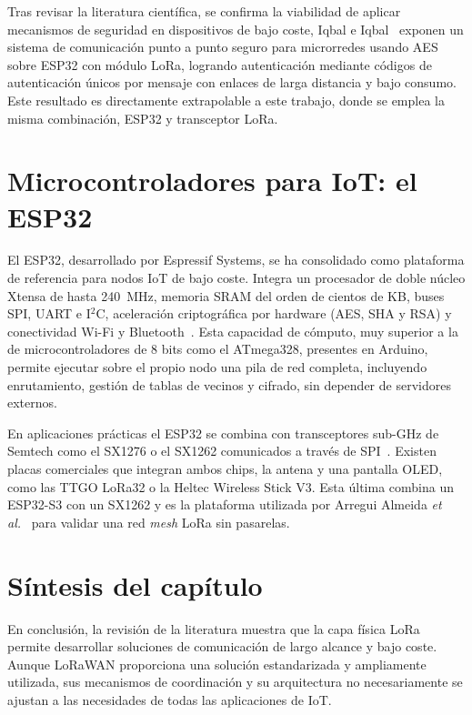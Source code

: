 Tras revisar la literatura científica, se confirma la viabilidad de aplicar mecanismos de seguridad en dispositivos de bajo coste, Iqbal e Iqbal~\cite{iqbal2018aes} exponen un sistema de comunicación punto a punto seguro para microrredes usando AES sobre ESP32 con módulo LoRa, logrando autenticación mediante códigos de autenticación únicos por mensaje con enlaces de larga distancia y bajo consumo. Este resultado es directamente extrapolable a este trabajo, donde se emplea la misma combinación, ESP32 y transceptor LoRa.

\section{Microcontroladores para IoT: el ESP32}

El ESP32, desarrollado por Espressif Systems, se ha consolidado como plataforma de referencia para nodos IoT de bajo coste. Integra un procesador de doble núcleo Xtensa de hasta 240~MHz, memoria SRAM del orden de cientos de KB, buses SPI, UART e I$^2$C, aceleración criptográfica por hardware (AES, SHA y RSA) y conectividad Wi-Fi y Bluetooth~\cite{espressif_esp32_datasheet}. Esta capacidad de cómputo, muy superior a la de microcontroladores de 8 bits como el ATmega328, presentes en Arduino, permite ejecutar sobre el propio nodo una pila de red completa, incluyendo enrutamiento, gestión de tablas de vecinos y cifrado, sin depender de servidores externos.

En aplicaciones prácticas el ESP32 se combina con transceptores sub-GHz de Semtech como el SX1276 o el SX1262 comunicados a través de SPI~\cite{semtech_sx1262_datasheet}. Existen placas comerciales que integran ambos chips, la antena y una pantalla OLED, como las TTGO LoRa32 o la Heltec Wireless Stick V3. Esta última combina un ESP32-S3 con un SX1262 y es la plataforma utilizada por Arregui Almeida \textit{et al.}~\cite{arregui2025gatewayfree} para validar una red \textit{mesh} LoRa sin pasarelas.

\section{Síntesis del capítulo}

En conclusión, la revisión de la literatura muestra que la capa física LoRa permite desarrollar soluciones de comunicación de largo alcance y bajo coste. Aunque LoRaWAN proporciona una solución estandarizada y ampliamente utilizada, sus mecanismos de coordinación y su arquitectura no necesariamente se ajustan a las necesidades de todas las aplicaciones de IoT.


